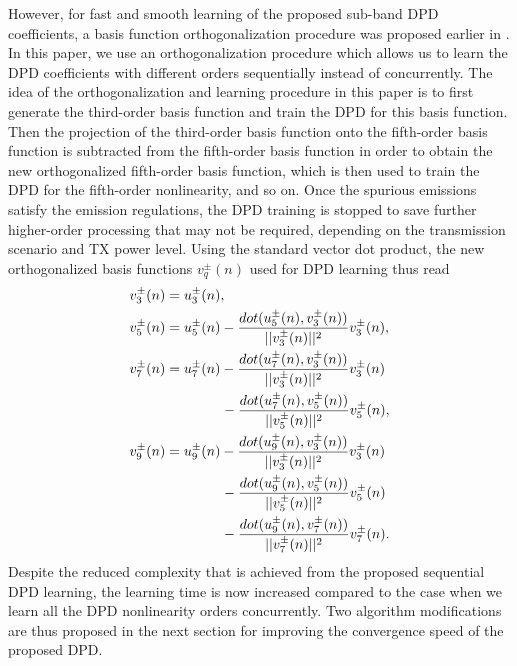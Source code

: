 However, for fast and smooth learning of the proposed sub-band DPD coefficients, a basis function orthogonalization procedure was proposed earlier in \cite{TMTT_SubbandDPD}. In this paper, we use an orthogonalization procedure which allows us to learn the DPD coefficients with different orders sequentially instead of concurrently. The idea of the orthogonalization and learning procedure in this paper is to first generate the third-order basis function and train the DPD for this basis function. Then the projection of the third-order basis function onto the fifth-order basis function is subtracted from the fifth-order basis function in order to obtain the new orthogonalized fifth-order basis function, which is then used to train the DPD for the fifth-order nonlinearity, and so on. Once the spurious emissions satisfy the emission regulations, the DPD training is stopped to save further higher-order processing that may not be required, depending on the transmission scenario and TX power level. Using the standard vector dot product, the new orthogonalized basis functions $v^\pm_q(n)$ used for DPD learning thus read
\begin{align}
\small
v^\pm_3(n) &= u^\pm_3(n), \label{eq:IM3_OrthBasis_1} \\
v^\pm_5(n) &= u^\pm_5(n) - \frac{dot(u^\pm_5(n),v^\pm_3(n))}{||v^\pm_3(n)||^2} v^\pm_3(n), \label{eq:IM3_OrthBasis_2} \\
v^\pm_7(n) &= u^\pm_7(n)   - \frac{dot(u^\pm_7(n),v^\pm_3(n))}{||v^\pm_3(n)||^2} v^\pm_3(n) \nonumber\\
&\:\:\:\:\:\:\:\:\:\:\:\:\:\:\:\:\:\: - \frac{dot(u^\pm_7(n),v^\pm_5(n))}{||v^\pm_5(n)||^2} v^\pm_5(n), \label{eq:IM3_OrthBasis_3}\\
v^\pm_9(n) &= u^\pm_9(n) - \frac{dot(u^\pm_9(n),v^\pm_3(n))}{||v^\pm_3(n)||^2} v^\pm_3(n) \nonumber\\
&\:\:\:\:\:\:\:\:\:\:\:\:\:\:\:\:\:\: - \frac{dot(u^\pm_9(n),v^\pm_5(n))}{||v^\pm_5(n)||^2} v^\pm_5(n) \nonumber\\ 
&\:\:\:\:\:\:\:\:\:\:\:\:\:\:\:\:\:\:	- \frac{dot(u^\pm_9(n),v^\pm_7(n))}{||v^\pm_7(n)||^2} v^\pm_7(n). \label{eq:IM3_OrthBasis_4}
\end{align}
\normalsize
Despite the reduced complexity that is achieved from the proposed sequential DPD learning, the learning time is now increased compared to the case when we learn all the DPD nonlinearity orders concurrently. Two algorithm modifications are thus proposed in the next section for improving the convergence speed of the proposed DPD.


